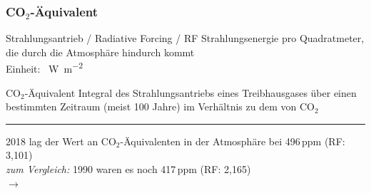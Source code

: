 \begin{frame}
	\frametitle{CO$_2$-Äquivalent}

	\begin{block}{Strahlungsantrieb / Radiative Forcing / RF}
		Strahlungsenergie pro Quadratmeter, die durch die Atmosphäre hindurch kommt \\
		Einheit: \SI{}{\watt\per\square\meter}
	\end{block}

	\begin{block}{CO$_2$-Äquivalent}
		Integral des Strahlungsantriebs eines Treibhausgases über einen bestimmten Zeitraum (meist 100 Jahre) im Verhältnis zu dem von CO$_2$

	\end{block}


	\color{gray}\rule{\linewidth}{1pt}

	\color{black}

	2018 lag der Wert an CO$_2$-Äquivalenten in der Atmosphäre bei 496\,ppm (RF: 3,101)\\
	\textit{zum Vergleich: } 1990 waren es noch 417\,ppm (RF: 2,165)\\
	$\rightarrow$ \color{red}{Zuwachs des Strahlungsantriebs um 43\,\% seit 1990}
\end{frame}

